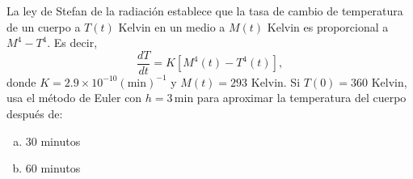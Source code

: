 \documentclass[12pt]{exam}
\begin{document}
\begin{questions}
     

     \question%
     La ley de Stefan de la radiación establece que la tasa de cambio de temperatura de un cuerpo a $T(t)$ Kelvin en un medio a $M(t)$ Kelvin es proporcional a $M^4-T^4$. Es decir, $$\frac{dT}{dt}=K\left[M^4(t)-T^4(t) \right],$$ donde $K=2.9\times10^{-10}(\text{min})^{-1}$ y $M(t)=293$ Kelvin. Si $T(0)=360$ Kelvin, usa el método de Euler con $h=3\,\text{min}$ para aproximar la temperatura del cuerpo después de:
     
     \begin{enumerate}[a)]
         \item 30 minutos
         \item 60 minutos
     \end{enumerate}
     


     
     

\end{questions}
\end{document}
